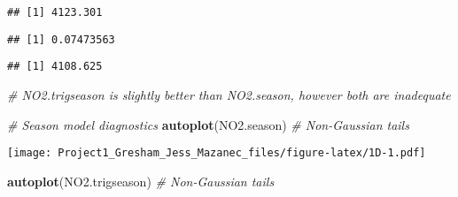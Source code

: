 \documentclass[
]{article}
\newenvironment{Shaded}{\begin{snugshade}}{\end{snugshade}}
\newcommand{\CommentTok}[1]{\textcolor[rgb]{0.56,0.35,0.01}{\textit{#1}}}
\newcommand{\DecValTok}[1]{\textcolor[rgb]{0.00,0.00,0.81}{#1}}
\newcommand{\KeywordTok}[1]{\textcolor[rgb]{0.13,0.29,0.53}{\textbf{#1}}}
\newcommand{\NormalTok}[1]{#1}
\newcommand{\OperatorTok}[1]{\textcolor[rgb]{0.81,0.36,0.00}{\textbf{#1}}}
\newcommand{\StringTok}[1]{\textcolor[rgb]{0.31,0.60,0.02}{#1}}
\begin{document}
\begin{verbatim}
## [1] 4123.301
\end{verbatim}

\begin{Shaded}
\end{Shaded}

\begin{verbatim}
## [1] 0.07473563
\end{verbatim}

\begin{Shaded}
\end{Shaded}

\begin{verbatim}
## [1] 4108.625
\end{verbatim}

\begin{Shaded}
\begin{Highlighting}[]
\CommentTok{# NO2.trigseason is slightly better than NO2.season, however both are inadequate}

\CommentTok{# Season model diagnostics}
\KeywordTok{autoplot}\NormalTok{(NO2.season) }\CommentTok{# Non-Gaussian tails}
\end{Highlighting}
\end{Shaded}

\texttt{[image: Project1\_Gresham\_Jess\_Mazanec\_files/figure-latex/1D-1.pdf]}

\begin{Shaded}
\begin{Highlighting}[]
\KeywordTok{autoplot}\NormalTok{(NO2.trigseason) }\CommentTok{# Non-Gaussian tails}
\end{Highlighting}
\end{Shaded}
\end{document}
